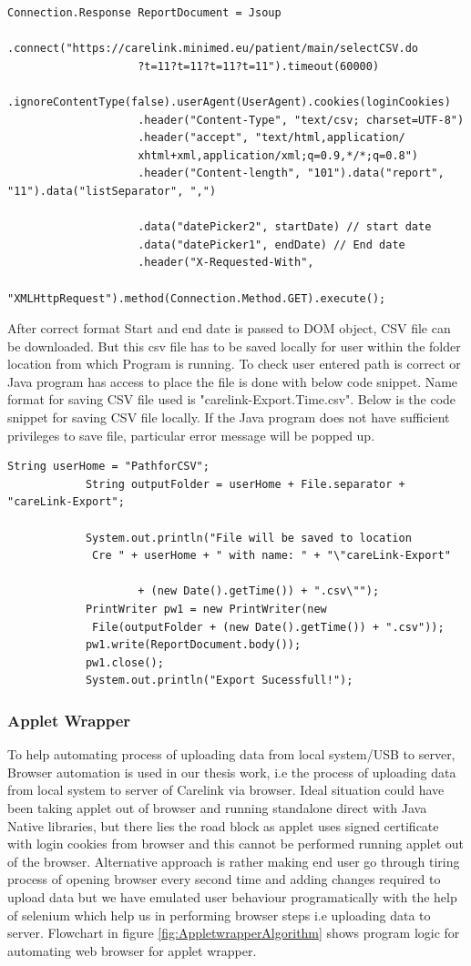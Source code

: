 \documentclass[article,type=msc,colorback,accentcolor=tud9c,twoside,11pt]{tudthesis}
\begin{document}
\begin{lstlisting}
Connection.Response ReportDocument = Jsoup
					.connect("https://carelink.minimed.eu/patient/main/selectCSV.do
					?t=11?t=11?t=11?t=11").timeout(60000)
					.ignoreContentType(false).userAgent(UserAgent).cookies(loginCookies)
					.header("Content-Type", "text/csv; charset=UTF-8")
					.header("accept", "text/html,application/
					xhtml+xml,application/xml;q=0.9,*/*;q=0.8")
					.header("Content-length", "101").data("report", "11").data("listSeparator", ",")
					
					.data("datePicker2", startDate) // start date
					.data("datePicker1", endDate) // End date
					.header("X-Requested-With",
					 "XMLHttpRequest").method(Connection.Method.GET).execute();
\end{lstlisting}
After correct  format Start and end date is passed to DOM object, CSV file can be downloaded. But this csv file has to be saved locally for user within the folder location from which Program is running. To check user entered path is correct or Java program has access to place the file is done with below code snippet. Name format for saving CSV file used is "carelink-Export.Time.csv". Below is the code snippet for saving CSV file locally. If the Java program does not have sufficient privileges to save file, particular error message will be popped up.
\begin{lstlisting}
String userHome = "PathforCSV";
			String outputFolder = userHome + File.separator + "careLink-Export";
			
			System.out.println("File will be saved to location
			 Cre " + userHome + " with name: " + "\"careLink-Export"
			
					+ (new Date().getTime()) + ".csv\"");
			PrintWriter pw1 = new PrintWriter(new
			 File(outputFolder + (new Date().getTime()) + ".csv"));
			pw1.write(ReportDocument.body());
			pw1.close();
			System.out.println("Export Sucessfull!");
\end{lstlisting}

\subsubsection{Applet Wrapper}
\label{subsec:AppletWrapper}
To help automating process of uploading data from local system/USB to server, Browser automation is used in our thesis work, i.e the process of uploading data from local system to server of Carelink via browser. Ideal situation could have been taking applet out of browser and running standalone direct with Java Native libraries, but there lies the road block as applet uses signed certificate with login cookies from browser and this cannot be performed running applet out of the browser. Alternative approach is rather making end user go through tiring process of opening browser every second time and adding changes required to upload data but we have emulated user behaviour programatically with the help of selenium which help us in performing browser steps i.e uploading data to server. Flowchart in figure \ref{fig:AppletwrapperAlgorithm} shows  program logic for automating web browser for applet wrapper.
\end{document}
